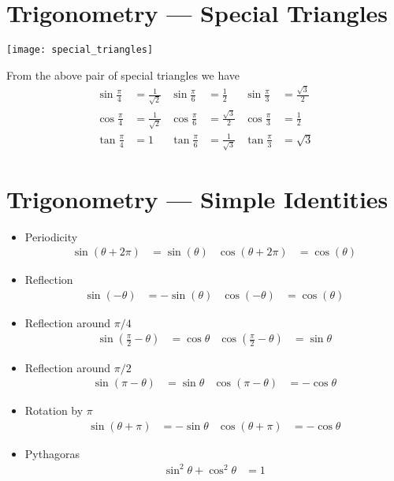 \section{Trigonometry --- Special Triangles}\label{sec_A_6}
\begin{center}
  \texttt{[image: special\_triangles]}
\end{center}
From the above pair of special triangles we have
\begin{align*}
  \sin \frac{\pi}{4} &= \frac{1}{\sqrt{2}} &  \sin \frac{\pi}{6} &= \frac{1}{2} & \sin \frac{\pi}{3} &= \frac{\sqrt{3}}{2} \\
  \cos \frac{\pi}{4} &= \frac{1}{\sqrt{2}} &  \cos \frac{\pi}{6} &= \frac{\sqrt{3}}{2} & \cos \frac{\pi}{3} &= \frac{1}{2} \\
  \tan \frac{\pi}{4} &= 1 &  \tan \frac{\pi}{6} &= \frac{1}{\sqrt{3}} & \tan
\frac{\pi}{3} &= \sqrt{3}
\end{align*}

\section{Trigonometry --- Simple Identities}\label{sec_A_7}
\begin{itemize}
 \item Periodicity
\begin{align*}
  \sin(\theta+2\pi) &= \sin(\theta) &
  \cos(\theta+2\pi) &= \cos(\theta)
\end{align*}
\item Reflection
\begin{align*}
  \sin(-\theta)&=-\sin(\theta) & \cos(-\theta) &=\cos(\theta)
\end{align*}
\item Reflection around $\pi/4$
\begin{align*}
\sin\left(\tfrac{\pi}{2}-\theta\right)&=\cos\theta &
\cos\left(\tfrac{\pi}{2}-\theta\right)&=\sin\theta
\end{align*}
\item Reflection around $\pi/2$
\begin{align*}
\sin\left(\pi-\theta\right)&=\sin\theta &
\cos\left(\pi-\theta\right)&=-\cos\theta
\end{align*}
\item Rotation by $\pi$
\begin{align*}
\sin\left(\theta+\pi\right)&=-\sin\theta &
\cos\left(\theta+\pi\right)&=-\cos\theta
\end{align*}
\item Pythagoras
\begin{align*}
\sin^2\theta + \cos^2 \theta &=1
\end{align*}

\end{itemize}


